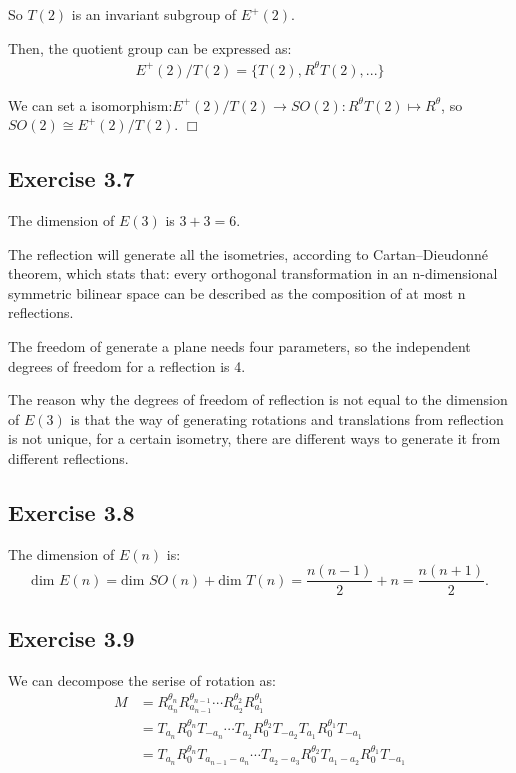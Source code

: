 \documentclass[]{ctexart}
\begin{document}
		So $T(2)$ is an invariant subgroup of $E^+(2)$.
		
		Then, the quotient group can be expressed as:
			\begin{equation*}
			\begin{aligned}
				E^+(2)/T(2)=\{T(2),R^{\theta}T(2),...\}
			\end{aligned}
			\end{equation*}
		
		We can set a isomorphism:$E^+(2)/T(2)\rightarrow SO(2):R^{\theta}T(2)\mapsto R^{\theta}$, so $SO(2)\cong E^+(2)/T(2)$. \qquad $\Box$
	
	\subsection{Exercise 3.7}
		The dimension of $E(3)$ is $3+3=6$. 
		
		The reflection will generate all the isometries, according to Cartan–Dieudonné theorem, which stats that: every orthogonal transformation in an n-dimensional symmetric bilinear space can be described as the composition of at most n reflections. 
		
		The freedom of generate a plane needs four parameters, so the independent degrees of freedom for a reflection is 4. 
		
		The reason why the degrees of freedom of reflection is not equal to the dimension of $E(3)$ is that the way of generating rotations and translations from reflection is not unique, for a certain isometry, there are different ways to generate it from different reflections. 
		
	\subsection{Exercise 3.8}
		The dimension of $E(n)$ is: 
			\begin{equation*}
				\text{dim }E(n)=\text{dim }SO(n)+\text{dim }T(n)=\frac{n(n-1)}{2}+n=\frac{n(n+1)}{2}.
			\end{equation*}
	
	\subsection{Exercise 3.9}
		We can decompose the serise of rotation as:
			\begin{equation*}
			\begin{aligned}
				M&=R_{a_{n}}^{\theta_{n}}R_{a_{n-1}}^{\theta_{n-1}}\cdots R_{a_{2}}^{\theta_{2}}R_{a_{1}}^{\theta_{1}}\\
				&=T_{a_{n}}R_{0}^{\theta_{n}}T_{-a_{n}}\cdots T_{a_{2}}R_{0}^{\theta_{2}}T_{-a_{2}}T_{a_{1}}R_{0}^{\theta_{1}}T_{-a_{1}}\\
				&=T_{a_{n}}R_{0}^{\theta_{n}}T_{a_{n-1}-a_{n}}\cdots T_{a_{2}-a_{3}}R_{0}^{\theta_{2}}T_{a_{1}-a_{2}}R_{0}^{\theta_{1}}T_{-a_{1}}
			\end{aligned}
			\end{equation*}
		
\end{document}
